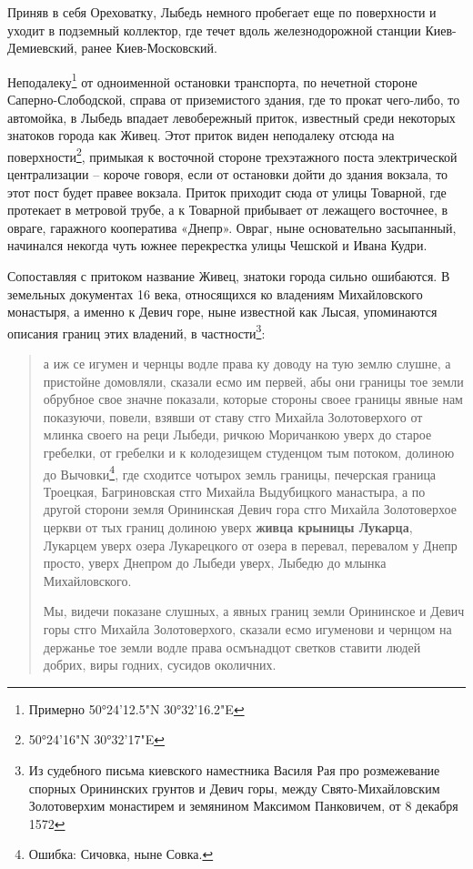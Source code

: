 Приняв в себя Ореховатку, Лыбедь немного пробегает еще по поверхности и уходит в подземный коллектор, где течет вдоль  железнодорожной станции Киев-Демиевский, ранее Киев-Московский.

Неподалеку\footnote{Примерно 50°24'12.5"N 30°32'16.2"E} от одноименной остановки транспорта, по нечетной стороне Саперно-Сло\-бодской, справа от приземистого здания, где то прокат чего-либо, то автомойка, в Лыбедь впадает левобережный приток, известный среди некоторых знатоков города как Живец. Этот приток виден неподалеку отсюда на поверхности\footnote{50°24'16"N 30°32'17"E}, примыкая к восточной стороне трехэтажного поста электрической централизации – короче говоря, если от остановки дойти до здания вокзала, то этот пост будет правее вокзала. Приток приходит сюда от улицы Товарной, где протекает в метровой трубе, а к Товарной прибывает от лежащего восточнее, в овраге, гаражного кооператива «Днепр». Овраг, ныне основательно засыпанный, начинался некогда чуть южнее перекрестка улицы Чешской и Ивана Кудри.

Сопоставляя с притоком название Живец, знатоки города сильно ошибаются. В земельных документах 16 века, относящихся ко владениям Михайловского монастыря, а именно к Девич горе,  ныне известной как Лысая, упоминаются описания границ этих владений, в частности\footnote{Из судебного письма киевского наместника Василя Рая про розмежевание спорных Орининских грунтов и Девич горы, между Свято-Михайловским
Золотоверхим монастирем и земянином Максимом Панковичем, от 8 декабря 1572}:

\begin{quotation}
а иж се игумен и чернцы водле права ку доводу на тую землю слушне, а пристойне домовляли, сказали есмо им первей, абы они границы тое земли обрубное свое значне показали, которые стороны своее границы явные нам показуючи, повели, взявши от ставу стго Михайла Золотоверхого от млинка своего на реци Лыбеди, ричкою Моричанкою уверх до старое гребелки, от гребелки и к колодезищем студенцом тым потоком, долиною до Вычовки\footnote{Ошибка: Сичовка, ныне Совка.}, где сходитсе чотырох земль границы,
печерская граница Троецкая, Багриновская стго Михайла Выдубицкого манастыра, а по другой сторони земля Орининская Девич гора стго Михайла Золотоверхое церкви от тых границ долиною уверх \textbf{живца крыницы Лукарца}, Лукарцем уверх озера Лукарецкого от озера в перевал, перевалом у Днепр просто, уверх Днепром до Лыбеди уверх, Лыбедю до млынка Михайловского.

Мы, видечи показане слушных, а явных границ земли Орининское и Девич горы стго Михайла Золотоверхого, сказали есмо игуменови и чернцом на держанье тое земли водле права осмънадцот светков ставити людей добрих, виры годних, сусидов околичних.\end{quotation}
 
